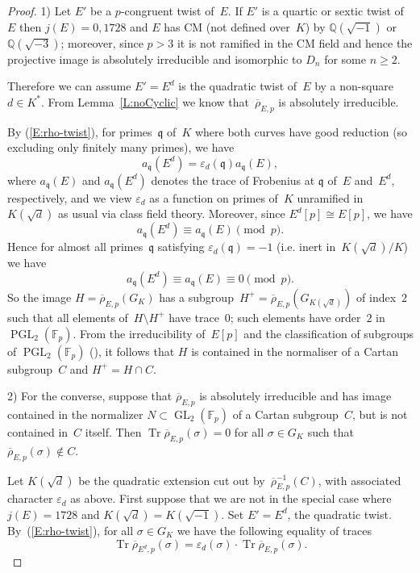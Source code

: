 \documentclass[12pt, reqno]{amsart}
\newcommand{\F}{\mathbb{F}}
\newcommand{\Q}{\mathbb{Q}}
\newcommand{\rhobar}{{\overline{\rho}}}
\newcommand{\frq}{{\mathfrak q}}
\newcommand{\eps}{\varepsilon}
\DeclareMathOperator{\Tr}{Tr}
\newcommand{\GL}{\operatorname{GL}}
\newcommand{\PGL}{\operatorname{PGL}}
\numberwithin{equation}{section}
\theoremstyle{definition}
\theoremstyle{remark}
\begin{document}
\begin{proof} 1) Let $E'$ be a $p$-congruent twist of~$E$. If $E'$ is a quartic or sextic twist of~$E$ then $j(E)=0,1728$ and $E$ has CM (not defined over~$K$) by $\Q(\sqrt{-1})$ or
  $\Q(\sqrt{-3})$; moreover, since $p > 3$ it is not ramified in the
  CM field and hence the projective image is absolutely irreducible
  and isomorphic to $D_n$ for some $n \geq 2$.

Therefore we can assume $E' = E^d$ is the quadratic twist of~$E$ by a
non-square $d\in K^*$.  From Lemma~\ref{L:noCyclic} we know
that~$\rhobar_{E,p}$ is absolutely irreducible.

By (\ref{E:rho-twist}), for primes~$\frq$
of~$K$ where both curves have good reduction (so excluding only
finitely many primes), we have
\[
  a_\frq(E^d) = \eps_d(\frq) a_\frq(E),
\]
where $a_\frq(E)$ and $a_\frq(E^d)$ denotes the trace of Frobenius at
$\frq$ of~$E$ and~$E^d$, respectively, and we view $\eps_d$ as a
function on primes of~$K$ unramified in~$K(\sqrt{d})$ as usual via
class field theory.  Moreover, since $E^d[p]\cong E[p]$, we have
\[
  a_\frq(E^d) \equiv a_\frq(E) \pmod{p}.
\]
Hence for almost all primes~$\frq$ satisfying $\eps_d(\frq) = -1$
(i.e. inert in~$K(\sqrt{d})/K$) we have
\[
  a_\frq(E^d) \equiv a_\frq(E) \equiv0 \pmod{p}.
\]
So the image $H=\rhobar_{E,p}(G_K)$ has a
subgroup~$H^+=\rhobar_{E,p}(G_{K(\sqrt{d})})$ of index~$2$ such that
all elements of~$H\setminus H^+$ have trace~$0$; such elements have
order~$2$ in $\PGL_2(\F_p)$. From the irreducibility of~$E[p]$ and the
classification of subgroups of $\PGL_2(\F_p)$ (\cite[Theorem
  XI.2.3]{LangModForms}), it follows that $H$ is contained in the
normaliser of a Cartan subgroup~$C$ and $H^+=H\cap C$.

2) For the converse, suppose that $\rhobar_{E,p}$ is absolutely irreducible and has image contained in
the normalizer $N \subset \GL_2(\F_p)$ of a Cartan subgroup~$C$, but
is not contained in~$C$ itself. Then $\Tr \rhobar_{E,p}(\sigma) = 0$
for all $\sigma \in G_K$ such that $\rhobar_{E,p}(\sigma) \not\in C$.

Let $K(\sqrt{d})$ be the quadratic extension cut out
by~$\rhobar_{E,p}^{-1}(C)$, with associated character $\eps_d$ as
above.  First suppose that we are not in the special case where
$j(E)=1728$ and $K(\sqrt{d})=K(\sqrt{-1})$.  Set $E'=E^d$, the
quadratic twist.  By~(\ref{E:rho-twist}), for all $\sigma \in G_K$ we
have the following equality of traces
\[\Tr \rhobar_{{E^d},p}(\sigma) = \eps_d(\sigma) \cdot \Tr \rhobar_{E,p}(\sigma).\]


\end{proof}
\end{document}
